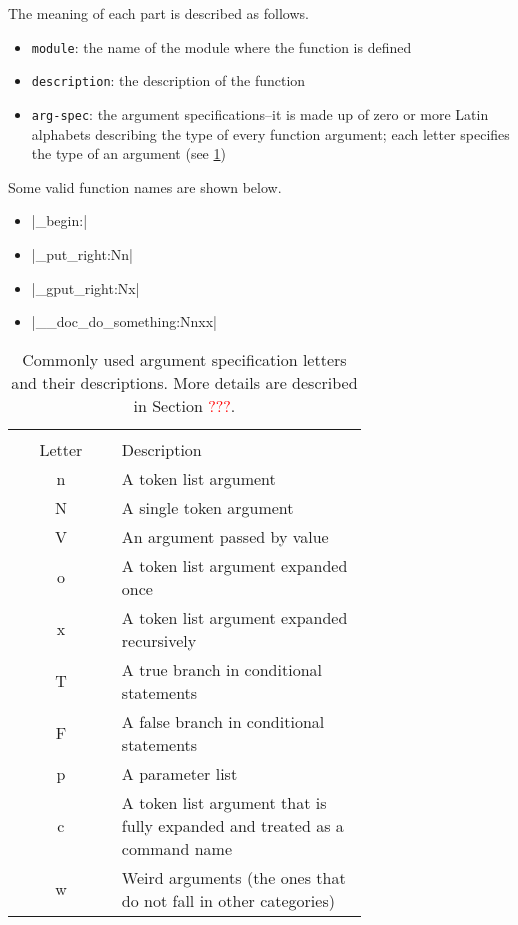 \documentclass{ltugboat}
\begin{document}
\vspace*{0.5\baselineskip}
\par\noindent
The meaning of each part is described as follows.
\begin{itemize}
\item \texttt{module}: the name of the module where the function is defined
\item \texttt{description}: the description of the function
\item \texttt{arg-spec}: the argument specifications--it is made up of zero or more Latin alphabets describing the type of every function argument; each letter specifies the type of an argument (see \cref{tbl:arg-spec-type})
\end{itemize}
Some valid function names are shown below.
\begin{itemize}
\item \inltex|\group_begin:|
\item \inltex|\tl_put_right:Nn|
\item \inltex|\tl_gput_right:Nx|
\item \inltex|\__doc_do_something:Nnxx|
\end{itemize}

\begin{table}[htpb]
\centering
\small
\setlength\extrarowheight{3pt}
\begin{tabular}{>{\ttfamily\centering}cm{0.7\linewidth}}
\toprule
\multicolumn{1}{c}{\makecell{\texttt{arg-spec}\\ Letter}} & Description\\ \midrule
n & A token list argument\\
N & A single token argument\\
V & An argument passed by value\\
o & A token list argument expanded once\\
x & A token list argument expanded recursively\\
T & A true branch in conditional statements\\
F & A false branch in conditional statements\\
p & A parameter list\\
c & A token list argument that is fully expanded and treated as a command name\\
w & Weird arguments (the ones that do not fall in other categories)\\
\bottomrule
\end{tabular}
\caption{Commonly used argument specification letters and their descriptions. More details are described in Section \textcolor{red}{???}.}
\label{tbl:arg-spec-type}
\end{table}
\end{document}
